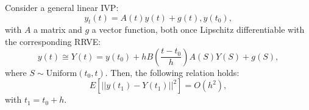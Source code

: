 \documentclass[a4paper,12pt]{article}
\begin{document}
\begin{conjecture}
  Consider a general linear IVP:
  \begin{equation}
    y_{t}(t)= A(t)y(t)+g(t), y(t_{0}),
  \end{equation}
  with $A$ a matrix and $g$ a vector function, both
  once Lipschitz differentiable with the corresponding RRVE:
  \begin{equation}
    y(t) \cong Y(t) = y(t_{0}) + h B \left( \frac{t-t_{0}}{h}\right)
    A(S) Y(S) + g(S),
  \end{equation}
  where $S \sim \text{Uniform}(t_{0},t)$. Then, the following relation holds:
  \begin{equation}
    E[||y(t_{1})-Y(t_{1})||^{2}] = O(h^{2}),
  \end{equation}
  with $t_{1} = t_{0} + h$.
\end{conjecture}
\end{document}
